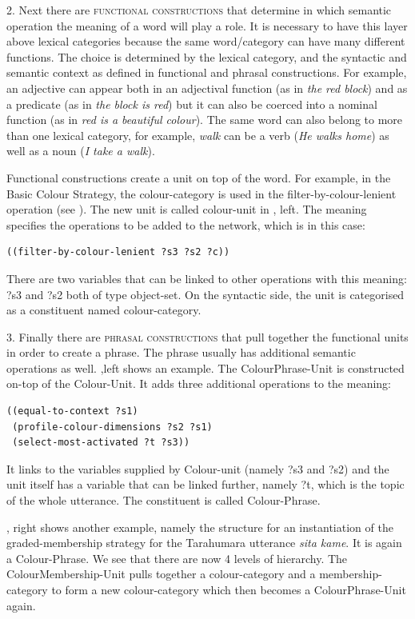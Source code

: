 2. Next there are {\scshape functional constructions} that determine in which semantic operation the meaning of a word 
will play a role. It is necessary to have this layer above lexical categories because the same word/category can have many 
different functions. The choice is determined by the lexical category, and the syntactic and semantic context as 
defined in functional and phrasal constructions. For example, an adjective can appear both in an adjectival 
function (as in \textit{the red block}) and as a predicate (as in \textit{the block is red}) but it can also be coerced 
into a nominal function (as in \textit{red is a beautiful colour}). The same word can also belong to more than one 
lexical category, for example, \textit{walk} can be a verb (\textit{He walks home}) as well as a noun (\textit{I take a walk}). 

Functional constructions create a unit on top of the word. For example, in the Basic Colour Strategy, 
the colour-category is used in the filter-by-colour-lenient operation (see ). 
The new unit is called colour-unit in , left. 
The meaning specifies the operations to be added to the network, which is in this case: 
\begin{verbatim}
((filter-by-colour-lenient ?s3 ?s2 ?c))
\end{verbatim}
There are two variables that can be linked to other operations with this meaning: ?s3 and ?s2 both of type object-set. 
On the syntactic side, the unit is categorised as a constituent named colour-category. 

3. Finally there are {\scshape phrasal constructions} that pull together the functional units in order to create a phrase. 
The phrase usually has additional semantic operations as well. ,left shows an example. 
The ColourPhrase-Unit is constructed on-top of the Colour-Unit. It adds three additional operations to the meaning: 
\begin{verbatim}
((equal-to-context ?s1)
 (profile-colour-dimensions ?s2 ?s1)
 (select-most-activated ?t ?s3))
\end{verbatim}
It links to the variables supplied by Colour-unit (namely ?s3 and ?s2) and the unit itself has a variable that can 
be linked further, namely ?t, which is the topic of the whole utterance. 
The constituent is called Colour-Phrase. 

, right shows another example, namely the structure for an instantiation of the 
graded-membership strategy for the Tarahumara utterance \textit{sita kame}. It is again a Colour-Phrase.
We see that there are now 4 levels of hierarchy. The ColourMembership-Unit pulls together a colour-category and 
a membership-category to form a new colour-category which then becomes a ColourPhrase-Unit again.

